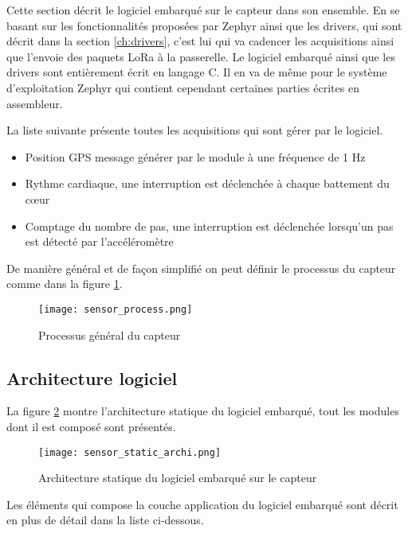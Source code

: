 Cette section décrit le logiciel embarqué sur le capteur dans son ensemble. En se basant sur les fonctionnalités proposées par Zephyr ainsi que les drivers, qui sont décrit dans la section \ref{ch:drivers}, c'est lui qui va cadencer les acquisitions ainsi que l'envoie des paquets LoRa à la passerelle. Le logiciel embarqué ainsi que les drivers sont entièrement écrit en langage C. Il en va de même pour le système d'exploitation Zephyr qui contient cependant certaines parties écrites en assembleur.

La liste suivante présente toutes les acquisitions qui sont gérer par le logiciel.

\begin{itemize}
\item Position GPS message générer par le module à une fréquence de 1 Hz
\item Rythme cardiaque, une interruption est déclenchée à chaque battement du cœur
\item Comptage du nombre de pas, une interruption est déclenchée lorsqu'un pas est détecté par l'accéléromètre
\end{itemize}

De manière général et de façon simplifié on peut définir le processus du capteur comme dans la figure \ref{fig:sensor_process}.

\begin{figure}[htb]
\centering 
\texttt{[image: sensor\_process.png]} 
\caption{Processus général du capteur}
\label{fig:sensor_process}
\end{figure}

\subsection{Architecture logiciel}

La figure \ref{fig:sensor_static_archi} montre l'architecture statique du logiciel embarqué, tout les modules dont il est composé sont présentés.

\begin{figure}[htb]
\centering 
\texttt{[image: sensor\_static\_archi.png]} 
\caption{Architecture statique du logiciel embarqué sur le capteur}
\label{fig:sensor_static_archi}
\end{figure}

Les éléments qui compose la couche application du logiciel embarqué sont décrit en plus de détail dans la liste ci-dessous.

